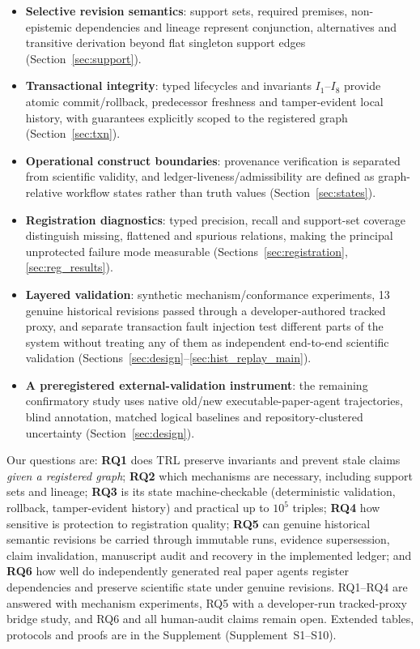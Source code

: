 \documentclass[cmc,article,submit,moreauthors,pdftex]{Definitions/tsp}
\newcommand{\suppl}[1]{Supplement~#1}
\begin{document}
\begin{itemize}
    \item \textbf{Selective revision semantics}: support sets, required premises, non-epistemic dependencies and lineage represent conjunction, alternatives and transitive derivation beyond flat singleton support edges (Section~\ref{sec:support}).
    \item \textbf{Transactional integrity}: typed lifecycles and invariants $I_1$--$I_8$ provide atomic commit/rollback, predecessor freshness and tamper-evident local history, with guarantees explicitly scoped to the registered graph (Section~\ref{sec:txn}).
    \item \textbf{Operational construct boundaries}: provenance verification is separated from scientific validity, and ledger-liveness/admissibility are defined as graph-relative workflow states rather than truth values (Section~\ref{sec:states}).
    \item \textbf{Registration diagnostics}: typed precision, recall and support-set coverage distinguish missing, flattened and spurious relations, making the principal unprotected failure mode measurable (Sections~\ref{sec:registration}, \ref{sec:reg_results}).
    \item \textbf{Layered validation}: synthetic mechanism/conformance experiments, 13 genuine historical revisions passed through a developer-authored tracked proxy, and separate transaction fault injection test different parts of the system without treating any of them as independent end-to-end scientific validation (Sections~\ref{sec:design}--\ref{sec:hist_replay_main}).
    \item \textbf{A preregistered external-validation instrument}: the remaining confirmatory study uses native old/new executable-paper-agent trajectories, blind annotation, matched logical baselines and repository-clustered uncertainty (Section~\ref{sec:design}).
\end{itemize}
Our questions are: \textbf{RQ1} does TRL preserve invariants and prevent stale claims \emph{given a registered graph}; \textbf{RQ2} which mechanisms are necessary, including support sets and lineage; \textbf{RQ3} is its state machine-checkable (deterministic validation, rollback, tamper-evident history) and practical up to $10^5$ triples; \textbf{RQ4} how sensitive is protection to registration quality; \textbf{RQ5} can genuine historical semantic revisions be carried through immutable runs, evidence supersession, claim invalidation, manuscript audit and recovery in the implemented ledger; and \textbf{RQ6} how well do independently generated real paper agents register dependencies and preserve scientific state under genuine revisions. RQ1--RQ4 are answered with mechanism experiments, RQ5 with a developer-run tracked-proxy bridge study, and RQ6 and all human-audit claims remain open. Extended tables, protocols and proofs are in the Supplement (\suppl{S1}--S10).
\end{document}
